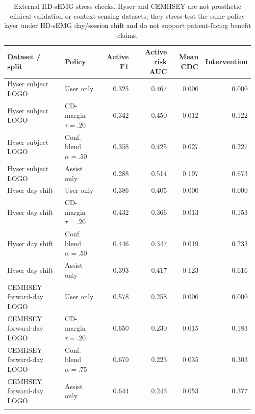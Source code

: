 \begin{table}[!t]
\centering
\caption{External HD-sEMG stress checks. Hyser and CEMHSEY are not prosthetic clinical-validation or context-sensing datasets; they stress-test the same policy layer under HD-sEMG day/session shift and do not support patient-facing benefit claims.}
\label{tab:external}
\footnotesize
\begin{tabular}{llrrrr}
\toprule
Dataset / split & Policy & Active F1 & Active risk AUC & Mean CDC & Intervention \\
\midrule
Hyser subject LOGO & User only & 0.325 & 0.467 & 0.000 & 0.000 \\
Hyser subject LOGO & CD-margin $\tau=.20$ & 0.342 & 0.450 & 0.012 & 0.122 \\
Hyser subject LOGO & Conf. blend $\alpha=.50$ & 0.358 & 0.425 & 0.027 & 0.227 \\
Hyser subject LOGO & Assist only & 0.288 & 0.514 & 0.197 & 0.673 \\
\addlinespace
Hyser day shift & User only & 0.386 & 0.405 & 0.000 & 0.000 \\
Hyser day shift & CD-margin $\tau=.20$ & 0.432 & 0.366 & 0.013 & 0.153 \\
Hyser day shift & Conf. blend $\alpha=.50$ & 0.446 & 0.347 & 0.019 & 0.233 \\
Hyser day shift & Assist only & 0.393 & 0.417 & 0.123 & 0.616 \\
\addlinespace
CEMHSEY forward-day LOGO & User only & 0.578 & 0.258 & 0.000 & 0.000 \\
CEMHSEY forward-day LOGO & CD-margin $\tau=.20$ & 0.650 & 0.230 & 0.015 & 0.183 \\
CEMHSEY forward-day LOGO & Conf. blend $\alpha=.75$ & 0.670 & 0.223 & 0.035 & 0.303 \\
CEMHSEY forward-day LOGO & Assist only & 0.644 & 0.243 & 0.053 & 0.377 \\
\addlinespace
\bottomrule
\end{tabular}
\end{table}

